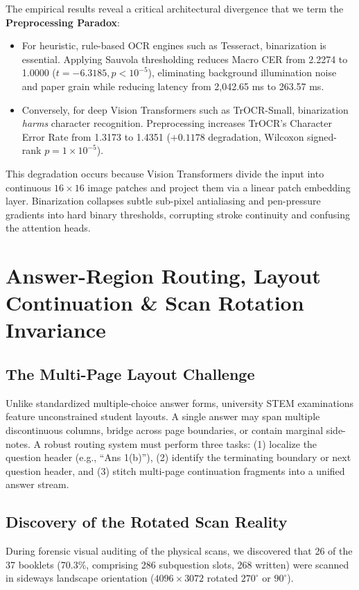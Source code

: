 \documentclass[journal]{IEEEtran}
\begin{document}
The empirical results reveal a critical architectural divergence that we term the \textbf{Preprocessing Paradox}:
\begin{itemize}
    \item For heuristic, rule-based OCR engines such as Tesseract, binarization is essential. Applying Sauvola thresholding reduces Macro CER from 2.2274 to 1.0000 ($t = -6.3185, p < 10^{-5}$), eliminating background illumination noise and paper grain while reducing latency from 2,042.65 ms to 263.57 ms.
    \item Conversely, for deep Vision Transformers such as TrOCR-Small, binarization \textit{harms} character recognition. Preprocessing increases TrOCR's Character Error Rate from 1.3173 to 1.4351 ($+0.1178$ degradation, Wilcoxon signed-rank $p = 1 \times 10^{-5}$). 
\end{itemize}
This degradation occurs because Vision Transformers divide the input into continuous $16 \times 16$ image patches and project them via a linear patch embedding layer. Binarization collapses subtle sub-pixel antialiasing and pen-pressure gradients into hard binary thresholds, corrupting stroke continuity and confusing the attention heads.

\section{Answer-Region Routing, Layout Continuation \& Scan Rotation Invariance}

\subsection{The Multi-Page Layout Challenge}
Unlike standardized multiple-choice answer forms, university STEM examinations feature unconstrained student layouts. A single answer may span multiple discontinuous columns, bridge across page boundaries, or contain marginal side-notes. A robust routing system must perform three tasks: (1) localize the question header (e.g., ``Ans 1(b)''), (2) identify the terminating boundary or next question header, and (3) stitch multi-page continuation fragments into a unified answer stream.

\subsection{Discovery of the Rotated Scan Reality}
During forensic visual auditing of the physical scans, we discovered that 26 of the 37 booklets (70.3\%, comprising 286 subquestion slots, 268 written) were scanned in sideways landscape orientation ($4096 \times 3072$ rotated $270^\circ$ or $90^\circ$).
\end{document}
